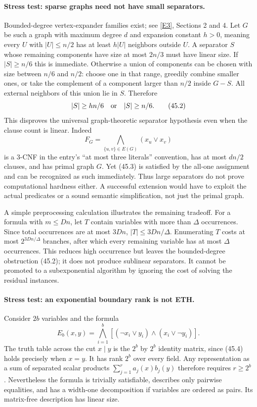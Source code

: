 \documentclass[11pt,a4paper]{article}
\newcommand{\eref}[2]{\hyperlink{extra:#1:#2}{[E#2]}}
\numberwithin{equation}{section}
\begin{document}
\paragraph{Stress test: sparse graphs need not have small separators.}
Bounded-degree vertex-expander families exist; see \eref{30006694}{3}, Sections
2 and 4. Let $G$ be such a graph with maximum degree $d$ and expansion
constant $h>0$, meaning every $U$ with $|U|\le n/2$ has at least
$h|U|$ neighbors outside $U$. A separator $S$ whose remaining components
have size at most $2n/3$ must have linear size. If $|S|\ge n/6$ this is
immediate. Otherwise a union of components can be chosen with size
between $n/6$ and $n/2$: choose one in that range, greedily combine
smaller ones, or take the complement of a component larger than $n/2$
inside $G-S$. All external neighbors of this union lie in $S$.
Therefore
\[
 |S|\ge hn/6\quad\hbox{or}\quad |S|\ge n/6. \tag{45.2}
\]
This disproves the universal graph-theoretic separator hypothesis even
when the clause count is linear. Indeed
\[
 F_G=\bigwedge_{\{u,v\}\in E(G)}(x_u\lor x_v) \tag{45.3}
\]
is a $3$-CNF in the entry's ``at most three literals'' convention, has
at most $dn/2$ clauses, and has primal graph $G$. Yet (45.3) is
satisfied by the all-one assignment and can be recognized as such
immediately. Thus large separators do not prove computational hardness
either. A successful extension would have to exploit the actual
predicates or a sound semantic simplification, not just the primal graph.

A simple preprocessing calculation illustrates the remaining tradeoff.
For a formula with $m\le Dn$, let $T$ contain variables with more than
$\Delta$ occurrences. Since total occurrences are at most $3Dn$,
$|T|\le3Dn/\Delta$. Enumerating $T$ costs at most
$2^{3Dn/\Delta}$ branches, after which every remaining variable has at
most $\Delta$ occurrences. This reduces high occurrence but leaves the
bounded-degree obstruction (45.2); it does not produce sublinear
separators. It cannot be promoted to a subexponential algorithm by
ignoring the cost of solving the residual instances.

\paragraph{Stress test: an exponential boundary rank is not ETH.}
Consider $2b$ variables and the formula
\[
 E_b(x,y)=\bigwedge_{i=1}^b
    [(\neg x_i\lor y_i)\land(x_i\lor\neg y_i)]. \tag{45.4}
\]
The truth table across the cut $x\mid y$ is the $2^b$ by $2^b$
identity matrix, since (45.4) holds precisely when $x=y$. It has rank
$2^b$ over every field. Any representation as a sum of separated scalar
products $\sum_{j=1}^r a_j(x)b_j(y)$ therefore requires $r\ge2^b$.
Nevertheless the formula is trivially satisfiable, describes only
pairwise equalities, and has a width-one decomposition if variables are
ordered as pairs. Its matrix-free description has linear size.
\end{document}
